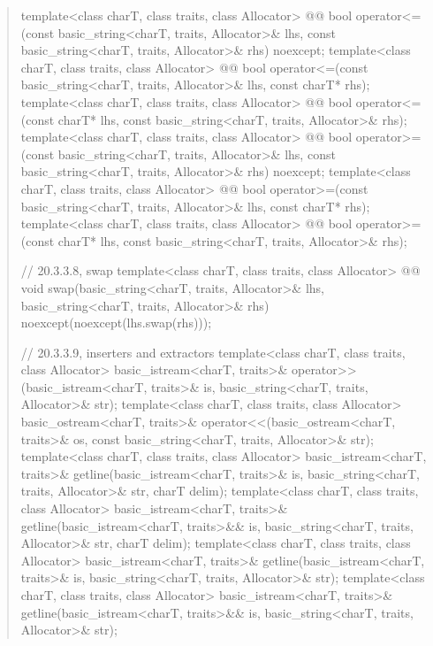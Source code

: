\documentclass{wg21}
\begin{document}
\begin{quote}
\begin{codeblock}
{  template<class charT, class traits, class Allocator>
    @@
    bool operator<=(const basic_string<charT, traits, Allocator>& lhs,
                    const basic_string<charT, traits, Allocator>& rhs) noexcept;
  template<class charT, class traits, class Allocator>
    @@
    bool operator<=(const basic_string<charT, traits, Allocator>& lhs,
                    const charT* rhs);
  template<class charT, class traits, class Allocator>
    @@
    bool operator<=(const charT* lhs,
                    const basic_string<charT, traits, Allocator>& rhs);
  template<class charT, class traits, class Allocator>
    @@
    bool operator>=(const basic_string<charT, traits, Allocator>& lhs,
                    const basic_string<charT, traits, Allocator>& rhs) noexcept;
  template<class charT, class traits, class Allocator>
    @@
    bool operator>=(const basic_string<charT, traits, Allocator>& lhs,
                    const charT* rhs);
  template<class charT, class traits, class Allocator>
    @@
    bool operator>=(const charT* lhs,
                    const basic_string<charT, traits, Allocator>& rhs);

  // 20.3.3.8, swap
  template<class charT, class traits, class Allocator>
    @@
    void swap(basic_string<charT, traits, Allocator>& lhs,
              basic_string<charT, traits, Allocator>& rhs)
      noexcept(noexcept(lhs.swap(rhs)));

  // 20.3.3.9, inserters and extractors
  template<class charT, class traits, class Allocator>
    basic_istream<charT, traits>&
      operator>>(basic_istream<charT, traits>& is,
                 basic_string<charT, traits, Allocator>& str);
  template<class charT, class traits, class Allocator>
    basic_ostream<charT, traits>&
      operator<<(basic_ostream<charT, traits>& os,
                 const basic_string<charT, traits, Allocator>& str);
  template<class charT, class traits, class Allocator>
    basic_istream<charT, traits>&
      getline(basic_istream<charT, traits>& is,
              basic_string<charT, traits, Allocator>& str,
              charT delim);
  template<class charT, class traits, class Allocator>
    basic_istream<charT, traits>&
      getline(basic_istream<charT, traits>&& is,
              basic_string<charT, traits, Allocator>& str,
              charT delim);
  template<class charT, class traits, class Allocator>
    basic_istream<charT, traits>&
      getline(basic_istream<charT, traits>& is,
              basic_string<charT, traits, Allocator>& str);
  template<class charT, class traits, class Allocator>
    basic_istream<charT, traits>&
      getline(basic_istream<charT, traits>&& is,
              basic_string<charT, traits, Allocator>& str);

}
\end{codeblock}
\end{quote}
\end{document}
